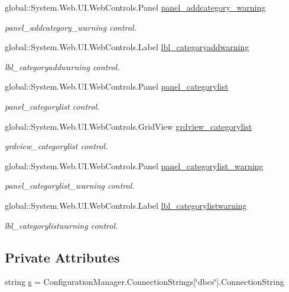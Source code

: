 \begin{DoxyCompactItemize}
global\+::\+System.\+Web.\+U\+I.\+Web\+Controls.\+Panel \mbox{\hyperlink{class_admin__category_a6959b0db57122c66b2dfe31f83fb7ae2}{panel\+\_\+addcategory\+\_\+warning}}
\begin{DoxyCompactList}\small\item\em panel\+\_\+addcategory\+\_\+warning control. \end{DoxyCompactList}\item 
global\+::\+System.\+Web.\+U\+I.\+Web\+Controls.\+Label \mbox{\hyperlink{class_admin__category_af6c9842cceff2decdfd45ff5dd08fa4e}{lbl\+\_\+categoryaddwarning}}
\begin{DoxyCompactList}\small\item\em lbl\+\_\+categoryaddwarning control. \end{DoxyCompactList}\item 
global\+::\+System.\+Web.\+U\+I.\+Web\+Controls.\+Panel \mbox{\hyperlink{class_admin__category_aa87242d0956054d6c61c7abe15add49c}{panel\+\_\+categorylist}}
\begin{DoxyCompactList}\small\item\em panel\+\_\+categorylist control. \end{DoxyCompactList}\item 
global\+::\+System.\+Web.\+U\+I.\+Web\+Controls.\+Grid\+View \mbox{\hyperlink{class_admin__category_a77c0c00ee741aaa7c00dea7c1b9c553e}{grdview\+\_\+categorylist}}
\begin{DoxyCompactList}\small\item\em grdview\+\_\+categorylist control. \end{DoxyCompactList}\item 
global\+::\+System.\+Web.\+U\+I.\+Web\+Controls.\+Panel \mbox{\hyperlink{class_admin__category_aaa166e50a21b90616ba7d49cca3ab9fc}{panel\+\_\+categorylist\+\_\+warning}}
\begin{DoxyCompactList}\small\item\em panel\+\_\+categorylist\+\_\+warning control. \end{DoxyCompactList}\item 
global\+::\+System.\+Web.\+U\+I.\+Web\+Controls.\+Label \mbox{\hyperlink{class_admin__category_a2f10c7d0aa94921f0a73bb2b18d021b8}{lbl\+\_\+categorylistwarning}}
\begin{DoxyCompactList}\small\item\em lbl\+\_\+categorylistwarning control. \end{DoxyCompactList}\end{DoxyCompactItemize}
\subsection*{Private Attributes}
\begin{DoxyCompactItemize}
\item 
string \mbox{\hyperlink{class_admin__category_ad07b55cca37cfcbe3f02139b816d72dd}{s}} = Configuration\+Manager.\+Connection\+Strings\mbox{[}\char`\"{}dbcs\char`\"{}\mbox{]}.Connection\+String
\end{DoxyCompactItemize}


